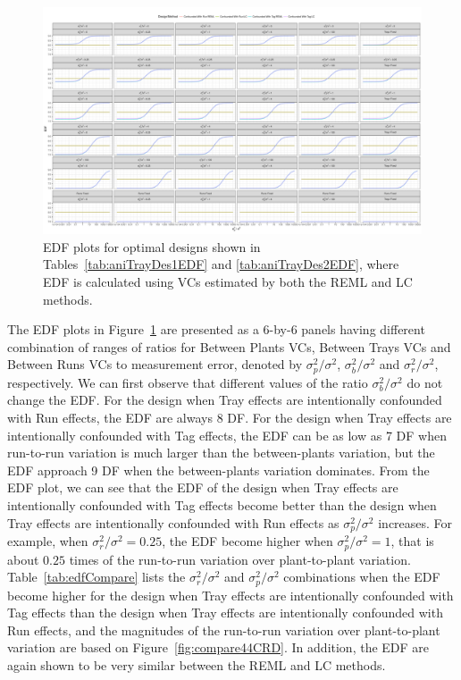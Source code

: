 \begin{landscape}
\begin{figure}[h!]
\centering
\includegraphics[width=1.3 \textwidth]{Chapter5/Graph/CRD44424.pdf}
\caption{EDF plots for optimal designs shown in Tables~\ref{tab:aniTrayDes1EDF} and \ref{tab:aniTrayDes2EDF}, where EDF is calculated using VCs estimated by both the REML and LC methods.}
\label{fig:RCBD442Tag4EDF}
\end{figure}
\end{landscape}

The EDF plots in Figure~\ref{fig:RCBD442Tag4EDF} are presented as a 6-by-6 panels having different combination of ranges of ratios for Between Plants VCs, Between Trays VCs and Between Runs VCs to measurement error, denoted by $\sigma_p^2/\sigma^2$, $\sigma_b^2/\sigma^2$ and $\sigma_r^2/\sigma^2$, respectively. We can first observe that different values of the ratio $\sigma_b^2/\sigma^2$ do not change the EDF. For the design when Tray effects are intentionally confounded with Run effects, the EDF are always 8 DF. For the design when Tray effects are intentionally confounded with Tag effects, the EDF can be as low as 7 DF when run-to-run variation is much larger than the between-plants variation, but the EDF approach 9 DF when the between-plants variation dominates. From the EDF plot, we can see that the EDF of the design when Tray effects are intentionally confounded with Tag effects become better than the design when Tray effects are intentionally confounded with Run effects as $\sigma_p^2/\sigma^2$ increases. For example, when $\sigma_r^2/\sigma^2 = 0.25$, the EDF become higher when $\sigma_p^2/\sigma^2 = 1$, that is about $0.25$ times of the run-to-run variation over plant-to-plant variation. Table~\ref{tab:edfCompare} lists the $\sigma_r^2/\sigma^2$ and $\sigma_p^2/\sigma^2$ combinations when the EDF become higher for the design when Tray effects are intentionally confounded with Tag effects than the design when Tray effects are intentionally confounded with Run effects, and the magnitudes of the run-to-run variation over plant-to-plant variation are based on Figure~\ref{fig:compare44CRD}. In addition, the EDF are again shown to be very similar between the REML and LC methods.

